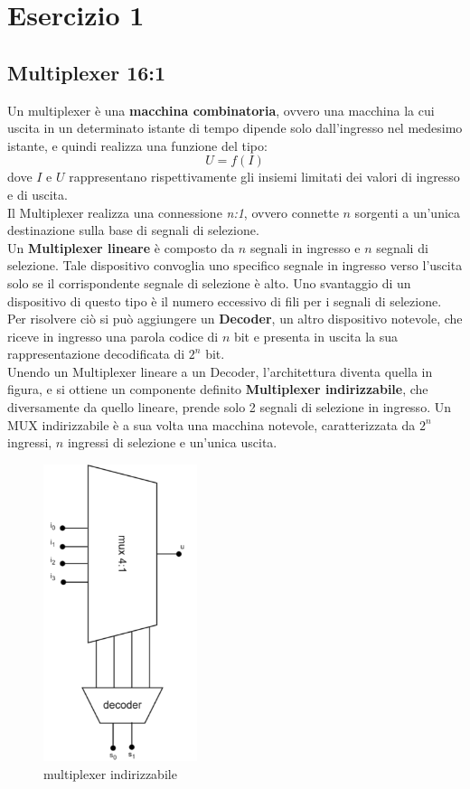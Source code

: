 \chapter{Esercizio 1}

\section{Multiplexer 16:1}
Un multiplexer è una \textbf{macchina combinatoria}, ovvero una macchina la cui uscita in un determinato istante di tempo dipende solo dall'ingresso nel medesimo istante, e quindi realizza una funzione del tipo:
\begin{equation*}
    U = f(I)
\end{equation*}
dove $I$ e $U$ rappresentano rispettivamente gli insiemi limitati dei valori di ingresso e di uscita.\\
Il Multiplexer realizza una connessione \textit{n:1}, ovvero connette $n$ sorgenti a un'unica destinazione sulla base di segnali di selezione.\\
Un \textbf{Multiplexer lineare} è composto da $n$ segnali in ingresso e $n$ segnali di selezione. Tale dispositivo convoglia uno specifico segnale in ingresso verso l'uscita solo se il corrispondente segnale di selezione è alto. Uno svantaggio di un dispositivo di questo tipo è il numero eccessivo di fili per i segnali di selezione. Per risolvere ciò si può aggiungere un \textbf{Decoder}, un altro dispositivo notevole, che riceve in ingresso una parola codice di $n$ bit e presenta in uscita la sua rappresentazione decodificata di \(2^n\) bit.\\
Unendo un Multiplexer lineare a un Decoder, l'architettura diventa quella in figura, e si ottiene un componente definito \textbf{Multiplexer indirizzabile}, che diversamente da quello lineare, prende solo 2 segnali di selezione in ingresso. Un MUX indirizzabile è a sua volta una macchina notevole, caratterizzata da \(2^n\) ingressi, $n$ ingressi di selezione e un'unica uscita.
\begin{figure}[H]
	\centering
	\includegraphics[width=0.4\textwidth]{img/mux_indirizz}
	\caption{multiplexer indirizzabile}
	\label{mux_16:1} 
\end{figure}
